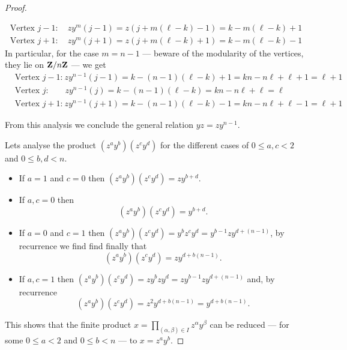 \begin{proof}
\begin{itemize}
\begin{gather*}
                  \text{Vertex } j - 1: \quad
                  z y^m(j - 1) = z(j + m (\ell - k) - 1) = k - m(\ell - k) + 1 \\
                  \text{Vertex } j + 1: \quad
                  z y^m(j + 1) = z(j + m (\ell - k) + 1) = k - m (\ell - k) - 1
              \end{gather*}
              In particular, for the case \(m = n - 1\) --- beware of the modularity of
              the vertices, they lie on \(\mathbf{Z}/n\mathbf{Z}\) --- we get
              \begin{align*}
                   & \text{Vertex } j - 1\text{:}\
                  zy^{n-1}(j - 1)
                  = k - (n - 1) (\ell - k) + 1
                  = k n - n \ell + \ell + 1
                  = \ell + 1
                  \\
                   & \text{Vertex } j\text{:} \qquad
                  zy^{n-1}(j)
                  = k - (n - 1) (\ell - k)
                  = kn - n \ell + \ell
                  = \ell
                  \\
                   & \text{Vertex } j + 1\text{:}\
                  zy^{n-1}(j + 1)
                  = k - (n - 1) (\ell - k) - 1
                  = k n - n \ell + \ell - 1
                  = \ell + 1
              \end{align*}
    \end{itemize}
    From this analysis we conclude the general relation \(y z = z y^{n-1}\).

    Lets analyse the product \((z^a y^b)(z^c y^d)\) for the different cases of \(0
    \leq a, c < 2\) and \(0 \leq b, d < n\).
    \begin{itemize}
        \item If \(a = 1\) and \(c = 0\) then \((z^a y^b)(z^c y^d) = z y^{b + d}\).
        \item If \(a, c = 0\) then
              \[
                  (z^a y^b)(z^c y^d) = y^{b + d}.
              \]
        \item If \(a = 0\) and \(c = 1\) then \((z^a y^b)(z^c y^d) = y^b z^c y^d =
              y^{b-1} z y^{d + (n - 1)}\), by recurrence we find find finally that
              \[
                  (z^a y^b)(z^c y^d) = z y^{d + b(n - 1)}.
              \]
        \item If \(a, c = 1\) then \((z^a y^b)(z^c y^d) = z y^b z y^d = z y^{b-1} z
              y^{d + (n - 1)}\) and, by recurrence
              \[
                  (z^a y^b)(z^c y^d) = z^2 y^{d + b(n - 1)} = y^{d + b(n - 1)}.
              \]
    \end{itemize}
    This shows that the finite product \(x = \prod_{(\alpha, \beta) \in I}
    z^\alpha y^\beta\) can be reduced --- for some \(0 \leq a < 2\) and \(0 \leq b
    < n\) --- to \(x = z^a y^b\).
\end{proof}

